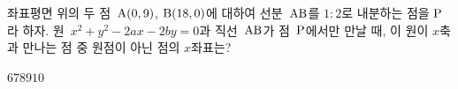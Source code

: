 좌표평면 위의 두 점~$\mathrm{A}(0{,}\mkern3mu 9)$, $\mathrm{B}(18{,}\mkern3mu 0)$에 대하여 선분~$\mathrm{AB}$를 $1:2$로 내분하는 점을 $\mathrm{P}$라 하자. 원~$x^2+y^2-2ax-2by=0$과 직선~$\mathrm{AB}$가 점~$\mathrm{P}$에서만 만날 때, 이 원이 $x$축과 만나는 점 중 원점이 아닌 점의 $x$좌표는? 
\begin{choices32}{$6$}{$7$}{$8$}{$9$}{$10$}\end{choices32}
